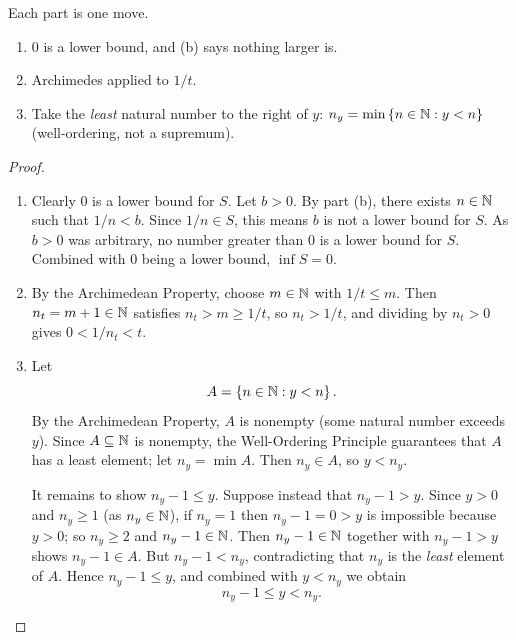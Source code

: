 \begin{idea}
    Each part is one move.
    \begin{enumerate}[label=(\alph*), nosep]
        \item $0$ is a lower bound, and (b) says nothing larger is.
        \item Archimedes applied to $1/t$.
        \item Take the \emph{least} natural number to the right of $y$: $n_y=\min\left\{n\in\mathbb{N}:y<n\right\}$ (well-ordering, not a supremum).
    \end{enumerate}
\end{idea}
\begin{proof}
    \begin{enumerate}[label=(\alph*)]
        \item Clearly $0$ is a lower bound for $S$. Let $b>0$. By part (b), there exists $n\in\mathbb{N}$ such that $1/n<b$. Since $1/n\in S$, this means $b$ is not a lower bound for $S$. As $b>0$ was arbitrary, no number greater than $0$ is a lower bound for $S$. Combined with $0$ being a lower bound, $\inf S=0$.

        \item By the Archimedean Property, choose $m\in\mathbb{N}$ with $1/t\leq m$. Then $n_t=m+1\in\mathbb{N}$ satisfies $n_t>m\geq1/t$, so $n_t>1/t$, and dividing by $n_t>0$ gives $0<1/n_t<t$.

        \item Let
        \[
            A=\left\{n\in\mathbb{N}:y<n\right\}.
        \]
        By the Archimedean Property, $A$ is nonempty (some natural number exceeds $y$). Since $A\subseteq\mathbb{N}$ is nonempty, the Well-Ordering Principle guarantees that $A$ has a least element; let $n_y=\min A$. Then $n_y\in A$, so $y<n_y$.

        It remains to show $n_y-1\leq y$. Suppose instead that $n_y-1>y$. Since $y>0$ and $n_y\geq1$ (as $n_y\in\mathbb{N}$), if $n_y=1$ then $n_y-1=0>y$ is impossible because $y>0$; so $n_y\geq2$ and $n_y-1\in\mathbb{N}$. Then $n_y-1\in\mathbb{N}$ together with $n_y-1>y$ shows $n_y-1\in A$. But $n_y-1<n_y$, contradicting that $n_y$ is the \emph{least} element of $A$. Hence $n_y-1\leq y$, and combined with $y<n_y$ we obtain
        \[
            n_y-1\leq y<n_y.
        \]
    \end{enumerate}
\end{proof}

